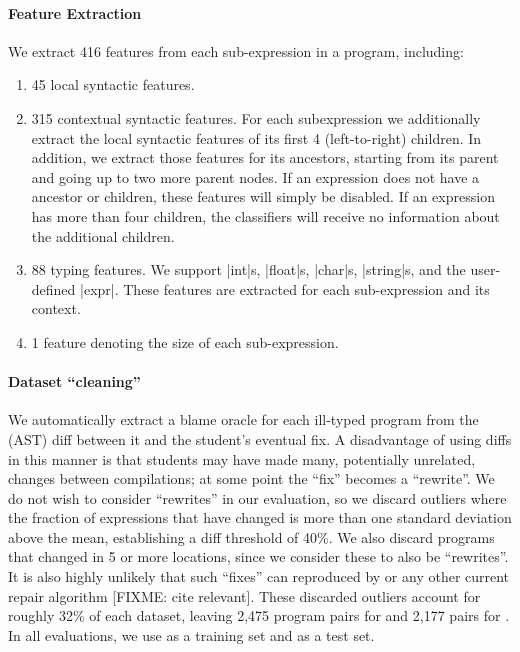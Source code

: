 \paragraph{Feature Extraction}
We extract 416 features from each sub-expression in a
program, including:
%
\begin{enumerate}
  \item 45 local syntactic features.
  \item 315 contextual syntactic features. For each subexpression we
    additionally extract the local syntactic features of its first 4
    (left-to-right) children. In addition, we extract those features for its
    ancestors, starting from its parent and going up to two more parent nodes.
    If an expression does not have a ancestor or children, these features will
    simply be disabled. If an expression has more than four children, the
    classifiers will receive no information about the additional children.
  \item 88 typing features. We support |int|s, |float|s, |char|s, |string|s, and
    the user-defined |expr|. These features are extracted for each
    sub-expression and its context.
  \item 1 feature denoting the size of each sub-expression.
\end{enumerate}

\paragraph{Dataset ``cleaning''}
We automatically extract a blame oracle for each ill-typed program from the
(AST) diff between it and the student's eventual fix. A disadvantage of using
diffs in this manner is that students may have made many, potentially unrelated,
changes between compilations; at some point the ``fix'' becomes a ``rewrite''.
We do not wish to consider ``rewrites'' in our evaluation, so we discard
outliers where the fraction of expressions that have changed is more than one
standard deviation above the mean, establishing a diff threshold of 40\%. We
also discard programs that changed in 5 or more locations, since we consider
these to also be ``rewrites''. It
is also highly unlikely that such ``fixes'' can reproduced by \toolname or any
other current repair algorithm [FIXME: cite relevant].
These discarded outliers account for
roughly 32\% of each dataset, leaving 2,475 program pairs for \SPRING
and 2,177 pairs for \FALL. In all evaluations, we use \SPRING as a training
set and \FALL as a test set.

